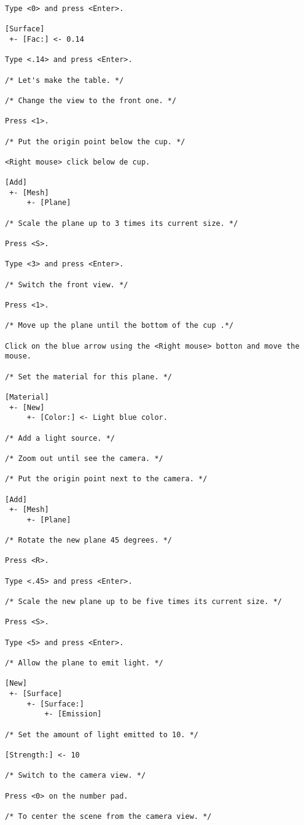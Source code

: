 \begin{verbatim}
Type <0> and press <Enter>.

[Surface]
 +- [Fac:] <- 0.14

Type <.14> and press <Enter>.

/* Let's make the table. */

/* Change the view to the front one. */

Press <1>.

/* Put the origin point below the cup. */

<Right mouse> click below de cup.

[Add]
 +- [Mesh]
     +- [Plane]

/* Scale the plane up to 3 times its current size. */

Press <S>.

Type <3> and press <Enter>.

/* Switch the front view. */

Press <1>.

/* Move up the plane until the bottom of the cup .*/

Click on the blue arrow using the <Right mouse> botton and move the mouse.

/* Set the material for this plane. */

[Material]
 +- [New]
     +- [Color:] <- Light blue color.

/* Add a light source. */

/* Zoom out until see the camera. */

/* Put the origin point next to the camera. */

[Add]
 +- [Mesh]
     +- [Plane]

/* Rotate the new plane 45 degrees. */

Press <R>.

Type <.45> and press <Enter>.

/* Scale the new plane up to be five times its current size. */

Press <S>.

Type <5> and press <Enter>.

/* Allow the plane to emit light. */

[New]
 +- [Surface]
     +- [Surface:]
         +- [Emission]

/* Set the amount of light emitted to 10. */

[Strength:] <- 10

/* Switch to the camera view. */

Press <0> on the number pad.

/* To center the scene from the camera view. */


\end{verbatim}
